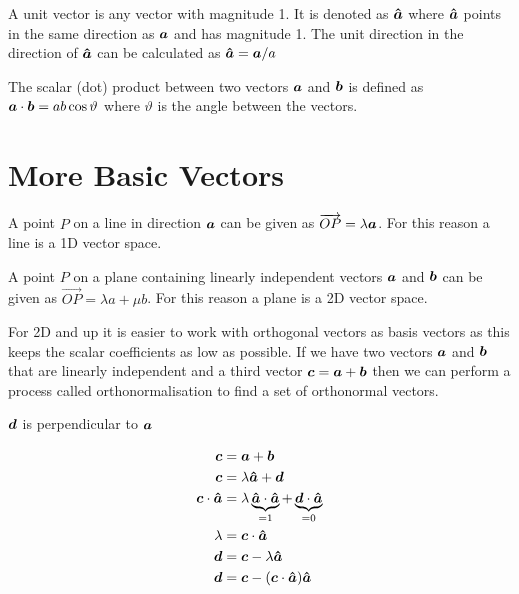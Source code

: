 \documentclass{article}
\begin{document}
    A unit vector is any vector with magnitude 1. It is denoted as \(\bm{\hat{a}}\) where \(\bm{\hat{a}}\) points in the same direction as \(\bm{a}\) and has magnitude 1.
    The unit direction in the direction of \(\bm{\hat{a}}\) can be calculated as \(\bm{\hat{a}} = \bm{a} / a\)
    
    The scalar (dot) product between two vectors \(\bm{a}\) and \(\bm{b}\) is defined as \(\bm{a}\cdot\bm{b} = ab\cos\vartheta\) where \(\vartheta\) is the angle between the vectors.
    
    \section{More Basic Vectors}
    A point \(P\) on a line in direction \(\bm{a}\) can be given as \(\overrightarrow{OP}=\lambda\bm{a}\). For this reason a line is a 1D vector space.
    
    A point \(P\) on a plane containing linearly independent vectors \(\bm{a}\) and \(\bm{b}\) can be given as \(\overrightarrow{OP} = \lambda a + \mu b\). For this reason a plane is a 2D vector space.
    
    For 2D and up it is easier to work with orthogonal vectors as basis vectors as this keeps the scalar coefficients as low as possible. If we have two vectors \(\bm{a}\) and \(\bm{b}\) that are linearly independent and a third vector \(\bm{c} = \bm{a} + \bm{b}\) then we can perform a process called orthonormalisation to find a set of orthonormal vectors.
    \begin{center}
    \end{center}
    \(\bm{d}\) is perpendicular to \(\bm{a}\)
    
    \begin{align*}
        \bm{c} &= \bm{a} + \bm{b}\\
        \bm{c} &= \lambda\bm{\hat{a}} + \bm{d}\\
        \bm{c}\cdot\bm{\hat{a}} &= \lambda\underbrace{\bm{\hat{a}}\cdot\bm{\hat{a}}}_{=1}+\underbrace{\bm{d}\cdot\bm{\hat{a}}}_{=0}\\
        \lambda &=\bm{c}\cdot \bm{\hat{a}}\\
        \bm{d} &= \bm{c} - \lambda\bm{\hat{a}}\\
        \bm{d} &= \bm{c} - (\bm{c}\cdot\bm{\hat{a}})\bm{\hat{a}}
    \end{align*}
    
\end{document}
